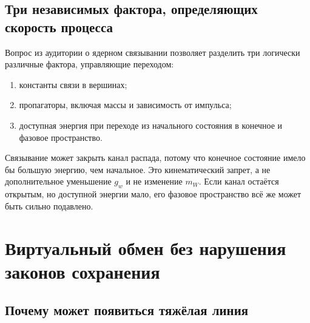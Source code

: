 \subsection{Три независимых фактора, определяющих скорость процесса}

Вопрос из аудитории о ядерном связывании позволяет разделить три логически различные фактора, управляющие переходом:
\begin{enumerate}
  \item константы связи в вершинах;
  \item пропагаторы, включая массы и зависимость от импульса;
  \item доступная энергия при переходе из начального состояния в конечное и фазовое пространство.
\end{enumerate}
Связывание может закрыть канал распада, потому что конечное состояние имело бы большую энергию, чем начальное. Это кинематический запрет, а не дополнительное уменьшение \(g_w\) и не изменение \(m_W\). Если канал остаётся открытым, но доступной энергии мало, его фазовое пространство всё же может быть сильно подавлено.

\begin{classroomqa}
\end{classroomqa}

\begin{classroomqa}
\end{classroomqa}

\section{Виртуальный обмен без нарушения законов сохранения}

\subsection{Почему может появиться тяжёлая линия}

